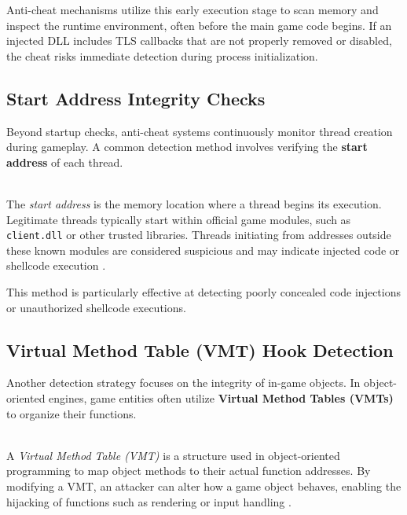 Anti-cheat mechanisms utilize this early execution stage to scan memory and inspect the runtime environment, often before the main game code begins. If an injected DLL includes TLS callbacks that are not properly removed or disabled, the cheat risks immediate detection during process initialization.

\subsection*{Start Address Integrity Checks}

Beyond startup checks, anti-cheat systems continuously monitor thread creation during gameplay. A common detection method involves verifying the \textbf{start address} of each thread.

\begin{tcolorbox}[colback=gray!10, colframe=gray!50, boxrule=0pt, sharp corners, width=\linewidth, left=1mm, right=1mm, top=0.5mm, bottom=0.5mm]
 \\
The \textit{start address} is the memory location where a thread begins its execution. Legitimate threads typically start within official game modules, such as \texttt{client.dll} or other trusted libraries. Threads initiating from addresses outside these known modules are considered suspicious and may indicate injected code or shellcode execution \parencite{guidedhacking2023startaddress}.
\end{tcolorbox}

This method is particularly effective at detecting poorly concealed code injections or unauthorized shellcode executions.

\subsection*{Virtual Method Table (VMT) Hook Detection}

Another detection strategy focuses on the integrity of in-game objects. In object-oriented engines, game entities often utilize \textbf{Virtual Method Tables (VMTs)} to organize their functions.

\begin{tcolorbox}[colback=gray!10, colframe=gray!50, boxrule=0pt, sharp corners, width=\linewidth, left=1mm, right=1mm, top=0.5mm, bottom=0.5mm]
 \\
A \textit{Virtual Method Table (VMT)} is a structure used in object-oriented programming to map object methods to their actual function addresses. By modifying a VMT, an attacker can alter how a game object behaves, enabling the hijacking of functions such as rendering or input handling \parencite{unknowncheats2024vmt}.
\end{tcolorbox}

